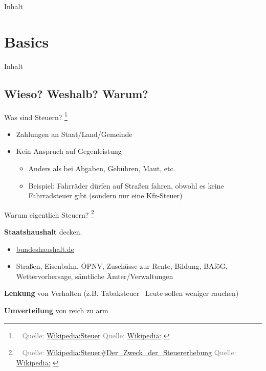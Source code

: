 \documentclass[draft]{beamer}
\let\oldfootnote\footnote
\renewcommand{\footnote}[1]
{%
	\oldfootnote
	{
		\tiny
		\textcolor{gray}{\ #1}
	}%
}
\newcommand{\citewiki}[2][]
{%
	\footnote
	{
		\ifthenelse{\isempty{#1}}
		{
			Quelle: \href{https://de.wikipedia.org/wiki/#2}{Wikipedia:#2}
		}
		{
			Quelle: \href{https://de.wikipedia.org/wiki/#2}{Wikipedia:#1}
		}
	}
}
\begin{document}
	\begin{frame}[t]{Inhalt}
		\tableofcontents[hidesubsections]
	\end{frame}
	
	\section{Basics}
	
		\begin{frame}[t]{Inhalt}
		\end{frame}
	
		\subsection{Wieso? Weshalb? Warum?}
	
			\begin{frame}{Was sind Steuern?\citewiki{Steuer}}
				\begin{itemize}
					\item Zahlungen an Staat/Land/Gemeinde
					\item Kein Anspruch auf Gegenleistung
					\begin{itemize}
						\item Anders als bei Abgaben, Gebühren, Maut, etc.
						\item Beispiel: Fahrräder dürfen auf Straßen fahren, obwohl es keine Fahrradsteuer gibt (sondern nur eine Kfz-Steuer)
					\end{itemize}
				\end{itemize}
			\end{frame}
		
			\begin{frame}{Warum eigentlich Steuern?\citewiki{Steuer\#Der\_Zweck\_der\_Steuererhebung}}
				\textbf{Staatshaushalt} decken.
				\begin{itemize}
					\item \href{https://www.bundeshaushalt.de/DE/Bundeshaushalt-digital/bundeshaushalt-digital.html}{bundeshaushalt.de}
					\item Straßen, Eisenbahn, ÖPNV, Zuschüsse zur Rente, Bildung, BAföG, Wettervorhersage, sämtliche Ämter/Verwaltungen
				\end{itemize}
			
				\textbf{Lenkung} von Verhalten (z.B. Tabaksteuer \textrightarrow\ Leute sollen weniger rauchen)
				
				\textbf{Umverteilung} von reich zu arm
			\end{frame}
		
\end{document}
